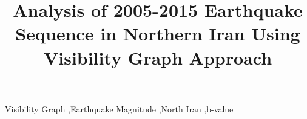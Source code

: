 \documentclass[a4paper,review]{elsarticle}
\begin{document}
\begin{frontmatter}

\title{Analysis of 2005-2015 Earthquake Sequence in Northern Iran Using Visibility Graph Approach}





\begin{keyword}
Visibility Graph \sep Earthquake Magnitude \sep North Iran \sep b-value 



\end{keyword}

\end{frontmatter}















\end{document}
